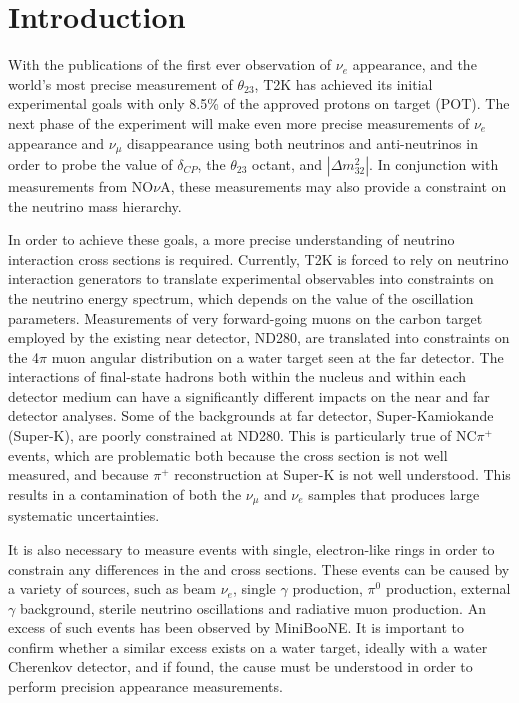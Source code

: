 \section{Introduction}
\label{sec:intro}

With the publications of the first ever observation of $\nu_e$ appearance, and the world's most precise measurement of $\theta_{23}$, T2K has achieved its initial experimental goals with only 8.5\% of the approved protons on target (POT). The next phase of the experiment will make even more precise measurements of $\nu_e$ appearance and $\nu_\mu$ disappearance using both neutrinos and anti-neutrinos in order to probe the value of $\delta_{CP}$, the $\theta_{23}$ octant, and $\left|\Delta m^2_{32}\right|$. In conjunction with measurements from NO$\nu$A, these measurements may also provide a constraint on the neutrino mass hierarchy.

In order to achieve these goals, a more precise understanding of neutrino interaction cross sections is required. Currently, T2K is forced to rely on neutrino interaction generators to translate experimental observables into constraints on the neutrino energy spectrum, which depends on the value of the oscillation parameters. Measurements of very forward-going muons on the carbon target employed by the existing near detector, ND280, are translated into constraints on the 4$\pi$ muon angular distribution on a water target seen at the far detector. The interactions of final-state hadrons both within the nucleus and within each detector medium can have a significantly different impacts on the near and far detector analyses. Some of the backgrounds at far detector, Super-Kamiokande (Super-K), are poorly constrained at ND280. This is particularly true of NC$\pi^+$ events, which are problematic both because the cross section is not well measured, and because $\pi^+$ reconstruction at Super-K is not well understood. This results in a contamination of both the $\nu_\mu$ and $\nu_e$ samples that produces large systematic uncertainties.

It is also necessary to measure events with single, electron-like rings in order to constrain any differences in the \nue and \numu cross sections. These events can be caused by a variety of sources, such as beam $\nu_e$, single $\gamma$ production, $\pi^0$ production, external $\gamma$ background, sterile neutrino oscillations and radiative muon production. An excess of such events has been observed by MiniBooNE. It is important to confirm whether a similar excess exists on a water target, ideally with a water Cherenkov detector, and if found, the cause must be understood in order to perform precision \nue appearance measurements.

